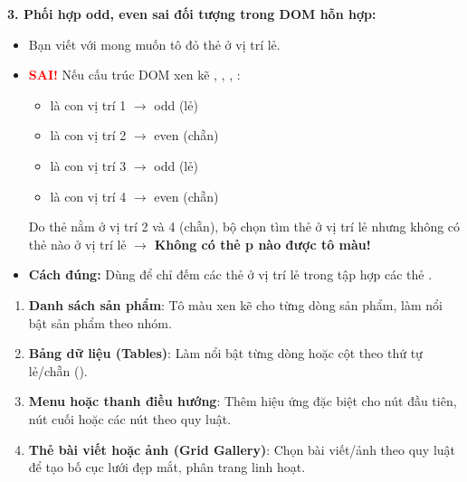 \begin{warnBox}
\par\vspace{5pt}
\textbf{3. Phối hợp odd, even sai đối tượng trong DOM hỗn hợp:}
\begin{itemize}[leftmargin=1.5em, itemsep=2pt, parsep=0pt]
    \item Bạn viết  với mong muốn tô đỏ thẻ  ở vị trí lẻ.
    \item \textcolor{red}{\textbf{SAI!}} Nếu cấu trúc DOM xen kẽ , , , :
    \begin{itemize}[leftmargin=1em]
        \item {} là con vị trí 1 $\rightarrow$ odd (lẻ)
        \item {} là con vị trí 2 $\rightarrow$ even (chẵn)
        \item {} là con vị trí 3 $\rightarrow$ odd (lẻ)
        \item {} là con vị trí 4 $\rightarrow$ even (chẵn)
    \end{itemize}
    Do thẻ  nằm ở vị trí 2 và 4 (chẵn), bộ chọn  tìm thẻ  ở vị trí lẻ nhưng không có thẻ  nào ở vị trí lẻ $\rightarrow$ \textbf{Không có thẻ p nào được tô màu!}
    \item \textbf{Cách đúng:} Dùng  để chỉ đếm các thẻ  ở vị trí lẻ trong tập hợp các thẻ .
\end{itemize}
\end{warnBox}

\begin{conceptBox}
\begin{enumerate}[leftmargin=1.5em, itemsep=3pt, parsep=0pt]
    \item \textbf{Danh sách sản phẩm}: Tô màu xen kẽ cho từng dòng sản phẩm, làm nổi bật sản phẩm theo nhóm.
    \item \textbf{Bảng dữ liệu (Tables)}: Làm nổi bật từng dòng hoặc cột theo thứ tự lẻ/chẵn ().
    \item \textbf{Menu hoặc thanh điều hướng}: Thêm hiệu ứng đặc biệt cho nút đầu tiên, nút cuối hoặc các nút theo quy luật.
    \item \textbf{Thẻ bài viết hoặc ảnh (Grid Gallery)}: Chọn bài viết/ảnh theo quy luật để tạo bố cục lưới đẹp mắt, phân trang linh hoạt.
\end{enumerate}
\end{conceptBox}

